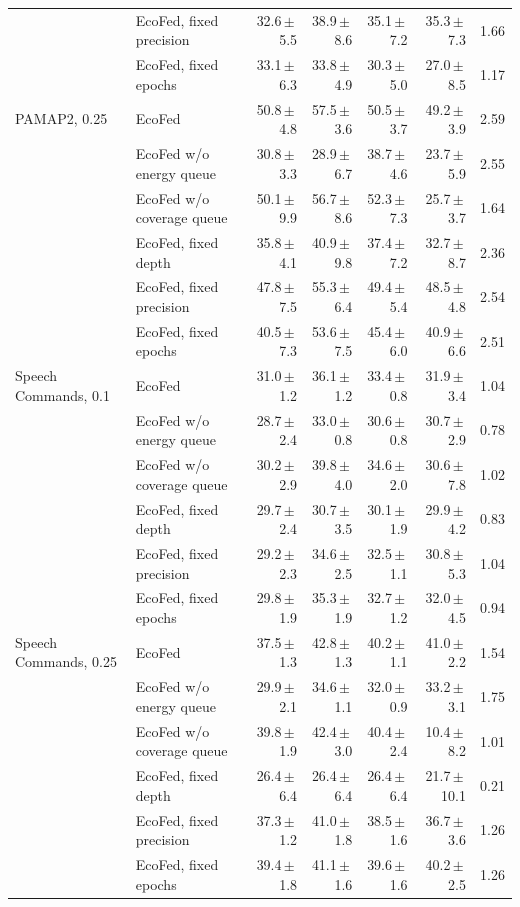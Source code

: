 \begin{tabular}{@{}llrrrrr@{}}
 & EcoFed, fixed precision & 32.6\,$\pm$\,5.5 & 38.9\,$\pm$\,8.6 & 35.1\,$\pm$\,7.2 & 35.3\,$\pm$\,7.3 & 1.66\\
 & EcoFed, fixed epochs & 33.1\,$\pm$\,6.3 & 33.8\,$\pm$\,4.9 & 30.3\,$\pm$\,5.0 & 27.0\,$\pm$\,8.5 & 1.17\\
\midrule
PAMAP2, 0.25 & EcoFed & 50.8\,$\pm$\,4.8 & 57.5\,$\pm$\,3.6 & 50.5\,$\pm$\,3.7 & 49.2\,$\pm$\,3.9 & 2.59\\
 & EcoFed w/o energy queue & 30.8\,$\pm$\,3.3 & 28.9\,$\pm$\,6.7 & 38.7\,$\pm$\,4.6 & 23.7\,$\pm$\,5.9 & 2.55\\
 & EcoFed w/o coverage queue & 50.1\,$\pm$\,9.9 & 56.7\,$\pm$\,8.6 & 52.3\,$\pm$\,7.3 & 25.7\,$\pm$\,3.7 & 1.64\\
 & EcoFed, fixed depth & 35.8\,$\pm$\,4.1 & 40.9\,$\pm$\,9.8 & 37.4\,$\pm$\,7.2 & 32.7\,$\pm$\,8.7 & 2.36\\
 & EcoFed, fixed precision & 47.8\,$\pm$\,7.5 & 55.3\,$\pm$\,6.4 & 49.4\,$\pm$\,5.4 & 48.5\,$\pm$\,4.8 & 2.54\\
 & EcoFed, fixed epochs & 40.5\,$\pm$\,7.3 & 53.6\,$\pm$\,7.5 & 45.4\,$\pm$\,6.0 & 40.9\,$\pm$\,6.6 & 2.51\\
\midrule
Speech Commands, 0.1 & EcoFed & 31.0\,$\pm$\,1.2 & 36.1\,$\pm$\,1.2 & 33.4\,$\pm$\,0.8 & 31.9\,$\pm$\,3.4 & 1.04\\
 & EcoFed w/o energy queue & 28.7\,$\pm$\,2.4 & 33.0\,$\pm$\,0.8 & 30.6\,$\pm$\,0.8 & 30.7\,$\pm$\,2.9 & 0.78\\
 & EcoFed w/o coverage queue & 30.2\,$\pm$\,2.9 & 39.8\,$\pm$\,4.0 & 34.6\,$\pm$\,2.0 & 30.6\,$\pm$\,7.8 & 1.02\\
 & EcoFed, fixed depth & 29.7\,$\pm$\,2.4 & 30.7\,$\pm$\,3.5 & 30.1\,$\pm$\,1.9 & 29.9\,$\pm$\,4.2 & 0.83\\
 & EcoFed, fixed precision & 29.2\,$\pm$\,2.3 & 34.6\,$\pm$\,2.5 & 32.5\,$\pm$\,1.1 & 30.8\,$\pm$\,5.3 & 1.04\\
 & EcoFed, fixed epochs & 29.8\,$\pm$\,1.9 & 35.3\,$\pm$\,1.9 & 32.7\,$\pm$\,1.2 & 32.0\,$\pm$\,4.5 & 0.94\\
\midrule
Speech Commands, 0.25 & EcoFed & 37.5\,$\pm$\,1.3 & 42.8\,$\pm$\,1.3 & 40.2\,$\pm$\,1.1 & 41.0\,$\pm$\,2.2 & 1.54\\
 & EcoFed w/o energy queue & 29.9\,$\pm$\,2.1 & 34.6\,$\pm$\,1.1 & 32.0\,$\pm$\,0.9 & 33.2\,$\pm$\,3.1 & 1.75\\
 & EcoFed w/o coverage queue & 39.8\,$\pm$\,1.9 & 42.4\,$\pm$\,3.0 & 40.4\,$\pm$\,2.4 & 10.4\,$\pm$\,8.2 & 1.01\\
 & EcoFed, fixed depth & 26.4\,$\pm$\,6.4 & 26.4\,$\pm$\,6.4 & 26.4\,$\pm$\,6.4 & 21.7\,$\pm$\,10.1 & 0.21\\
 & EcoFed, fixed precision & 37.3\,$\pm$\,1.2 & 41.0\,$\pm$\,1.8 & 38.5\,$\pm$\,1.6 & 36.7\,$\pm$\,3.6 & 1.26\\
 & EcoFed, fixed epochs & 39.4\,$\pm$\,1.8 & 41.1\,$\pm$\,1.6 & 39.6\,$\pm$\,1.6 & 40.2\,$\pm$\,2.5 & 1.26\\
\bottomrule
\end{tabular}